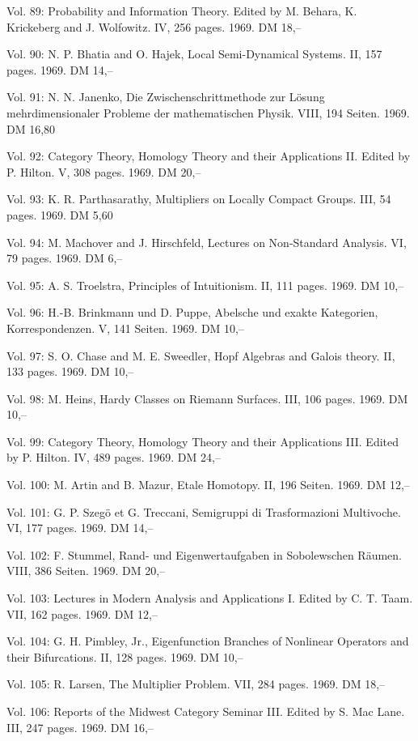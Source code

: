 Vol. 89: Probability and Information Theory. Edited by M. Behara, K. Krickeberg and J. Wolfowitz. IV, 256 pages. 1969. DM 18,--

Vol. 90: N. P. Bhatia and O. Hajek, Local Semi-Dynamical Systems. II, 157 pages. 1969. DM 14,--

Vol. 91: N. N. Janenko, Die Zwischenschrittmethode zur Lösung mehrdimensionaler Probleme der mathematischen Physik. VIII, 194 Seiten. 1969. DM 16,80

Vol. 92: Category Theory, Homology Theory and their Applications II. Edited by P. Hilton. V, 308 pages. 1969. DM 20,--

Vol. 93: K. R. Parthasarathy, Multipliers on Locally Compact Groups. III, 54 pages. 1969. DM 5,60

Vol. 94: M. Machover and J. Hirschfeld, Lectures on Non-Standard Analysis. VI, 79 pages. 1969. DM 6,--

Vol. 95: A. S. Troelstra, Principles of Intuitionism. II, 111 pages. 1969. DM 10,--

Vol. 96: H.-B. Brinkmann und D. Puppe, Abelsche und exakte Kategorien, Korrespondenzen. V, 141 Seiten. 1969. DM 10,--

Vol. 97: S. O. Chase and M. E. Sweedler, Hopf Algebras and Galois theory. II, 133 pages. 1969. DM 10,--

Vol. 98: M. Heins, Hardy Classes on Riemann Surfaces. III, 106 pages. 1969. DM 10,--

Vol. 99: Category Theory, Homology Theory and their Applications III. Edited by P. Hilton. IV, 489 pages. 1969. DM 24,--

Vol. 100: M. Artin and B. Mazur, Etale Homotopy. II, 196 Seiten. 1969. DM 12,--

Vol. 101: G. P. Szegö et G. Treccani, Semigruppi di Trasformazioni Multivoche. VI, 177 pages. 1969. DM 14,--

Vol. 102: F. Stummel, Rand- und Eigenwertaufgaben in Sobolewschen Räumen. VIII, 386 Seiten. 1969. DM 20,--

Vol. 103: Lectures in Modern Analysis and Applications I. Edited by C. T. Taam. VII, 162 pages. 1969. DM 12,--

Vol. 104: G. H. Pimbley, Jr., Eigenfunction Branches of Nonlinear Operators and their Bifurcations. II, 128 pages. 1969. DM 10,--

Vol. 105: R. Larsen, The Multiplier Problem. VII, 284 pages. 1969. DM 18,--

Vol. 106: Reports of the Midwest Category Seminar III. Edited by S. Mac Lane. III, 247 pages. 1969. DM 16,--

